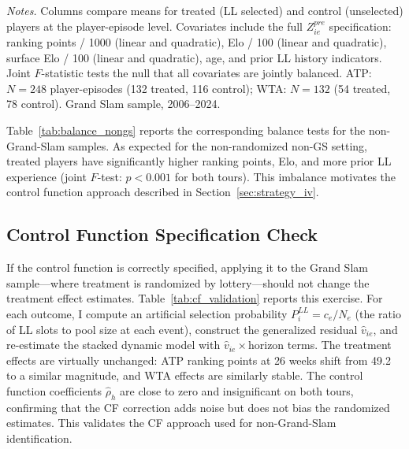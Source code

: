 \begin{table}[htbp]
\centering
\caption{Pre-Treatment Balance: Grand Slam Samples}
\label{tab:balance}
\begin{threeparttable}
\small

\begin{tablenotes}
\footnotesize
\item \textit{Notes.} Columns compare means for treated (LL selected) and control (unselected) players at the player-episode level. Covariates include the full $Z^{pre}_{ie}$ specification: ranking points / 1000 (linear and quadratic), Elo / 100 (linear and quadratic), surface Elo / 100 (linear and quadratic), age, and prior LL history indicators. Joint $F$-statistic tests the null that all covariates are jointly balanced. ATP: $N = 248$ player-episodes (132 treated, 116 control); WTA: $N = 132$ (54 treated, 78 control). Grand Slam sample, 2006--2024.
\end{tablenotes}
\end{threeparttable}
\end{table}

Table~\ref{tab:balance_nongs} reports the corresponding balance tests for the non-Grand-Slam samples. As expected for the non-randomized non-GS setting, treated players have significantly higher ranking points, Elo, and more prior LL experience (joint $F$-test: $p < 0.001$ for both tours). This imbalance motivates the control function approach described in Section~\ref{sec:strategy_iv}.

\subsection{Control Function Specification Check}
\label{sec:robustness_cf}

If the control function is correctly specified, applying it to the Grand Slam sample---where treatment is randomized by lottery---should not change the treatment effect estimates. Table~\ref{tab:cf_validation} reports this exercise. For each outcome, I compute an artificial selection probability $P_i^{LL} = c_e / N_e$ (the ratio of LL slots to pool size at each event), construct the generalized residual $\hat{v}_{ie}$, and re-estimate the stacked dynamic model with $\hat{v}_{ie} \times \text{horizon}$ terms. The treatment effects are virtually unchanged: ATP ranking points at 26 weeks shift from 49.2 to a similar magnitude, and WTA effects are similarly stable. The control function coefficients $\hat{\rho}_h$ are close to zero and insignificant on both tours, confirming that the CF correction adds noise but does not bias the randomized estimates. This validates the CF approach used for non-Grand-Slam identification.

